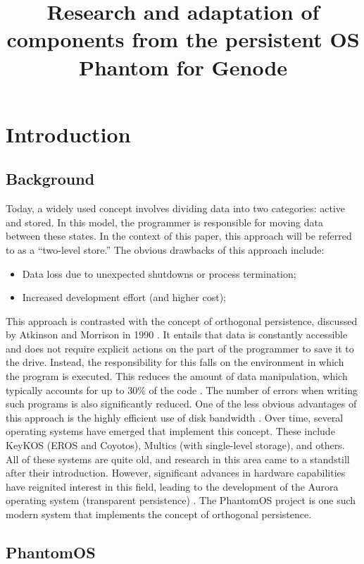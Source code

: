 \title{Research and adaptation of components from the persistent OS Phantom for Genode}
\chapter{Introduction}
\label{chap:intro}


\section{Background}

Today, a widely used concept involves dividing data into two categories: active and stored. In this model, the programmer is responsible for moving data between these states. In the context of this paper, this approach will be referred to as a “two-level store.” The obvious drawbacks of this approach include:
\begin{itemize}
    \item Data loss due to unexpected shutdowns or process termination;
    \item Increased development effort (and higher cost);
\end{itemize}
This approach is contrasted with the concept of orthogonal persistence, discussed by Atkinson and Morrison in 1990 \cite{PLA}. It entails that data is constantly accessible and does not require explicit actions on the part of the programmer to save it to the drive. Instead, the responsibility for this falls on the environment in which the program is executed. This reduces the amount of data manipulation, which typically accounts for up to 30\% of the code \cite{PLA}. The number of errors when writing such programs is also significantly reduced. One of the less obvious advantages of this approach is the highly efficient use of disk bandwidth \cite{KOS}. Over time, several operating systems have emerged that implement this concept. These include KeyKOS (EROS and Coyotos), Multics (with single-level storage), and others. All of these systems are quite old, and research in this area came to a standstill after their introduction. However, significant advances in hardware capabilities have reignited interest in this field, leading to the development of the Aurora operating system (transparent persistence) \cite{Aurora}. The PhantomOS project is one such modern system that implements the concept of orthogonal persistence.


\section{PhantomOS}

